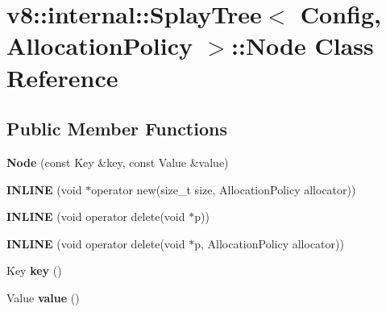 \hypertarget{classv8_1_1internal_1_1_splay_tree_1_1_node}{}\section{v8\+:\+:internal\+:\+:Splay\+Tree$<$ Config, Allocation\+Policy $>$\+:\+:Node Class Reference}
\label{classv8_1_1internal_1_1_splay_tree_1_1_node}
\subsection*{Public Member Functions}
\begin{DoxyCompactItemize}
\item 
\hypertarget{classv8_1_1internal_1_1_splay_tree_1_1_node_afbf36c9ccaf941f68622801a7533d0d0}{}{\bfseries Node} (const Key \&key, const Value \&value)\label{classv8_1_1internal_1_1_splay_tree_1_1_node_afbf36c9ccaf941f68622801a7533d0d0}

\item 
\hypertarget{classv8_1_1internal_1_1_splay_tree_1_1_node_a9bd54f48663614ee09849439846660b8}{}{\bfseries I\+N\+L\+I\+N\+E} (void $\ast$operator new(size\+\_\+t size, Allocation\+Policy allocator))\label{classv8_1_1internal_1_1_splay_tree_1_1_node_a9bd54f48663614ee09849439846660b8}

\item 
\hypertarget{classv8_1_1internal_1_1_splay_tree_1_1_node_af779ae09bffd8be418ea99be2c38a2a5}{}{\bfseries I\+N\+L\+I\+N\+E} (void operator delete(void $\ast$p))\label{classv8_1_1internal_1_1_splay_tree_1_1_node_af779ae09bffd8be418ea99be2c38a2a5}

\item 
\hypertarget{classv8_1_1internal_1_1_splay_tree_1_1_node_a24fc9f2bc36cc51ffb9ede55042c5624}{}{\bfseries I\+N\+L\+I\+N\+E} (void operator delete(void $\ast$p, Allocation\+Policy allocator))\label{classv8_1_1internal_1_1_splay_tree_1_1_node_a24fc9f2bc36cc51ffb9ede55042c5624}

\item 
\hypertarget{classv8_1_1internal_1_1_splay_tree_1_1_node_a7ae7043f1ada5717bdfb33f2397ae750}{}Key {\bfseries key} ()\label{classv8_1_1internal_1_1_splay_tree_1_1_node_a7ae7043f1ada5717bdfb33f2397ae750}

\item 
\hypertarget{classv8_1_1internal_1_1_splay_tree_1_1_node_ad59061dcf7804af21eaf46c293ba6fe9}{}Value {\bfseries value} ()\label{classv8_1_1internal_1_1_splay_tree_1_1_node_ad59061dcf7804af21eaf46c293ba6fe9}


\end{DoxyCompactItemize}
